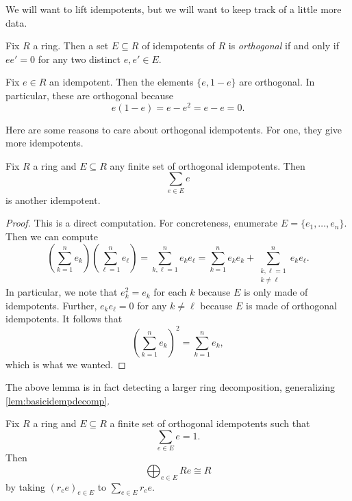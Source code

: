 \documentclass[../notes.tex]{subfiles}
\begin{document}
We will want to lift idempotents, but we will want to keep track of a little more data.
\begin{definition}
	Fix $R$ a ring. Then a set $E\subseteq R$ of idempotents of $R$ is \textit{orthogonal} if and only if $ee'=0$ for any two distinct $e,e'\in E$.
\end{definition}
\begin{example}
	Fix $e\in R$ an idempotent. Then the elements $\{e,1-e\}$ are orthogonal. In particular, these are orthogonal because
	\[e(1-e)=e-e^2=e-e=0.\]
\end{example}
Here are some reasons to care about orthogonal idempotents. For one, they give more idempotents.
\begin{lemma} \label{lem:sumidemps}
	Fix $R$ a ring and $E\subseteq R$ any finite set of orthogonal idempotents. Then
	\[\sum_{e\in E}e\]
	is another idempotent.
\end{lemma}
\begin{proof}
	This is a direct computation. For concreteness, enumerate $E=\{e_1,\ldots,e_n\}$. Then we can compute
	\[\left(\sum_{k=1}^ne_k\right)\left(\sum_{\ell=1}^ne_\ell\right)=\sum_{k,\ell=1}^ne_ke_\ell=\sum_{k=1}^ne_ke_k+\sum_{\substack{k,\ell=1\\k\ne\ell}}^ne_ke_\ell.\]
	In particular, we note that $e_k^2=e_k$ for each $k$ because $E$ is only made of idempotents. Further, $e_ke_\ell=0$ for any $k\ne\ell$ because $E$ is made of orthogonal idempotents. It follows that
	\[\left(\sum_{k=1}^ne_k\right)^2=\sum_{k=1}^ne_k,\]
	which is what we wanted.
\end{proof}
The above lemma is in fact detecting a larger ring decomposition, generalizing \autoref{lem:basicidempdecomp}.
\begin{lemma} \label{lem:idempringdecomp}
	Fix $R$ a ring and $E\subseteq R$ a finite set of orthogonal idempotents such that
	\[\sum_{e\in E}e=1.\]
	Then
	\[\bigoplus_{e\in E}Re\cong R\]
	by taking $(r_ee)_{e\in E}$ to $\sum_{e\in E}r_ee$.
\end{lemma}
\end{document}
